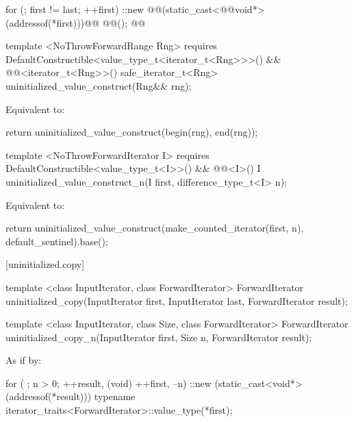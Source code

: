 \begin{codeblock}
        for (; first != last; ++first)
          ::new @@(static_cast<@@void*>(addressof(*first)))@\added{)}@
            @@();
        @@
\end{codeblock}

{\color{addclr}
\begin{codeblock}
template <NoThrowForwardRange Rng>
  requires DefaultConstructible<value_type_t<iterator_t<Rng>>>() &&
           @@<iterator_t<Rng>>()
    safe_iterator_t<Rng>
    uninitialized_value_construct(Rng&& rng);
\end{codeblock}

\pnum
\effects Equivalent to:
\begin{codeblock}
        return uninitialized_value_construct(begin(rng), end(rng));
\end{codeblock}

\begin{codeblock}
template <NoThrowForwardIterator I>
  requires DefaultConstructible<value_type_t<I>>() &&
           @@<I>()
    I uninitialized_value_construct_n(I first, difference_type_t<I> n);
\end{codeblock}

\pnum
\effects Equivalent to:
\begin{codeblock}
        return uninitialized_value_construct(make_counted_iterator(first, n),
                                             default_sentinel{}).base();
\end{codeblock}
} %

[uninitialized.copy]{}
{\color{remclr}
\begin{codeblock}
template <class InputIterator, class ForwardIterator>
  ForwardIterator uninitialized_copy(InputIterator first, InputIterator last,
                                     ForwardIterator result);
\end{codeblock}

\setcounter{Paras}{1}
\pnum
\returns {}
\begin{codeblock}
template <class InputIterator, class Size, class ForwardIterator>
  ForwardIterator uninitialized_copy_n(InputIterator first, Size n,
                                       ForwardIterator result);
\end{codeblock}

\pnum
\effects As if by:
\begin{codeblock}
        for ( ; n > 0; ++result, (void) ++first, --n) {
          ::new (static_cast<void*>(addressof(*result)))
            typename iterator_traits<ForwardIterator>::value_type(*first);
        }
\end{codeblock}

\pnum
\returns {}
} %

